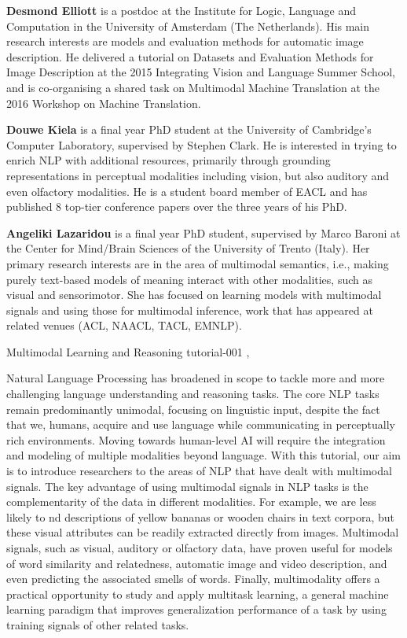 \begin{bio}
  {\bfseries Desmond Elliott} is a postdoc at the Institute for Logic, Language and Computation in the University of Amsterdam (The Netherlands). His main research interests are models and evaluation methods for automatic image description. He delivered a tutorial on Datasets and Evaluation Methods for Image Description at the 2015 Integrating Vision and Language Summer School, and is co-organising a shared task on Multimodal Machine Translation at the 2016 Workshop on Machine Translation.

  {\bfseries Douwe Kiela} is a final year PhD student at the University of Cambridge's Computer Laboratory, supervised by Stephen Clark. He is interested in trying to enrich NLP with additional resources, primarily through grounding representations in perceptual modalities including vision, but also auditory and even olfactory modalities. He is a student board member of EACL and has published 8 top-tier conference papers over the three years of his PhD.

  {\bfseries Angeliki Lazaridou} is a final year PhD student, supervised by Marco Baroni at the Center for Mind/Brain Sciences of the University of Trento (Italy). Her primary research interests are in the area of multimodal semantics, i.e., making purely text-based models of meaning interact with other modalities, such as visual and sensorimotor. She has focused on learning models with multimodal signals and using those for multimodal inference, work that has appeared at related venues (ACL, NAACL, TACL, EMNLP).
\end{bio}

\begin{tutorial}
  {Multimodal Learning and Reasoning}
  {tutorial-001}
  {\daydateyear, \tutorialmorningtime}
  {\TutLocA}

Natural Language Processing has broadened in scope to tackle more and more challenging language understanding and reasoning tasks. The core NLP tasks remain predominantly unimodal, focusing on linguistic input, despite the fact that we, humans, acquire and use language while communicating in perceptually rich environments. Moving towards human-level AI will require the integration and modeling of multiple modalities beyond language. With this tutorial, our aim is to introduce researchers to the areas of NLP that have dealt with multimodal signals. The key advantage of using multimodal signals in NLP tasks is the complementarity of the data in different modalities. For example, we are less likely to nd descriptions of yellow bananas or wooden chairs in text corpora, but these visual attributes can be readily extracted directly from images. Multimodal signals, such as visual, auditory or olfactory data, have proven useful for models of word similarity and relatedness, automatic image and video description, and even predicting the associated smells of words. Finally, multimodality offers a practical opportunity to study and apply multitask learning, a general machine learning paradigm that improves generalization performance of a task by using training signals of other related tasks.

\end{tutorial}
